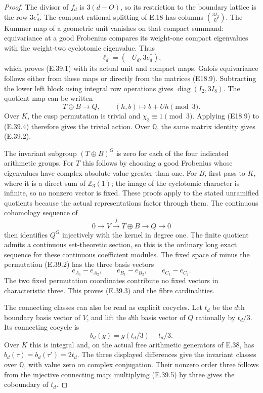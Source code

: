 \begin{proof}
The divisor of $f_d$ is $3(d-O)$, so its restriction to
the boundary lattice is the row $3e_d^*$. The compact
rational splitting of E.18 has columns $\binom{3I_2}{U}$.
The Kummer map of a geometric unit vanishes on that
compact summand: equivariance at a good Frobenius compares
its weight-one compact eigenvalues with the weight-two
cyclotomic eigenvalue. Thus
\[
 \ell_d=(-U_d,3e_d^*),
\]
which proves (E.39.1) with its actual unit and compact
maps. Galois equivariance follows either from these maps
or directly from the matrices (E18.9). Subtracting the
lower left block using integral row operations gives
$\operatorname{diag}(I_2,3I_8)$. The quotient map can be
written
\[
 T\oplus B\longrightarrow Q,\qquad
 (h,b)\longmapsto b+Uh\pmod3.
 \tag{E.39.4}
\]
Over $K$, the cusp permutation is trivial and
$\chi_3\equiv1\pmod3$. Applying (E18.9) to (E.39.4)
therefore gives the trivial action. Over $\mathbb Q$,
the same matrix identity gives (E.39.2).

The invariant subgroup $(T\oplus B)^G$ is zero for each
of the four indicated arithmetic groups. For $T$ this
follows by choosing a good Frobenius whose eigenvalues
have complex absolute value greater than one. For $B$,
first pass to $K$, where it is a direct sum of
$\mathbb Z_3(1)$; the image of the cyclotomic character
is infinite, so no nonzero vector is fixed. These proofs
apply to the stated unramified quotients because the
actual representations factor through them.
The continuous cohomology sequence of
\[
 0\longrightarrow V\xrightarrow{j}T\oplus B
       \longrightarrow Q\longrightarrow0
\]
then identifies $Q^G$ injectively with the kernel in
degree one. The finite quotient admits a continuous
set-theoretic section, so this is the ordinary long exact
sequence for these continuous coefficient modules.
The fixed space of minus the permutation (E.39.2) has
the three basis vectors
\[
 e_{A_1}-e_{A_2},\qquad e_{B_1}-e_{B_2},\qquad
 e_{C_1}-e_{C_2}.
\]
The two fixed permutation coordinates contribute no
fixed vectors in characteristic three. This proves
(E.39.3) and the fibre cardinalities.

The connecting classes can also be read as explicit
cocycles. Let $t_d$ be the $d$th boundary basis vector
of $V$, and lift the $d$th basis vector of $Q$ rationally
by $t_d/3$. Its connecting cocycle is
\[
 b_d(g)=g(t_d/3)-t_d/3.
 \tag{E.39.5}
\]
Over $K$ this is integral and, on the actual free
arithmetic generators of E.38, has
$b_d(\tau)=b_d(\tau')=2t_d$. The three displayed
differences give the invariant classes over
$\mathbb Q$, with value zero on complex conjugation.
Their nonzero order three follows from the injective
connecting map; multiplying (E.39.5) by three gives
the coboundary of $t_d$.


\end{proof}
